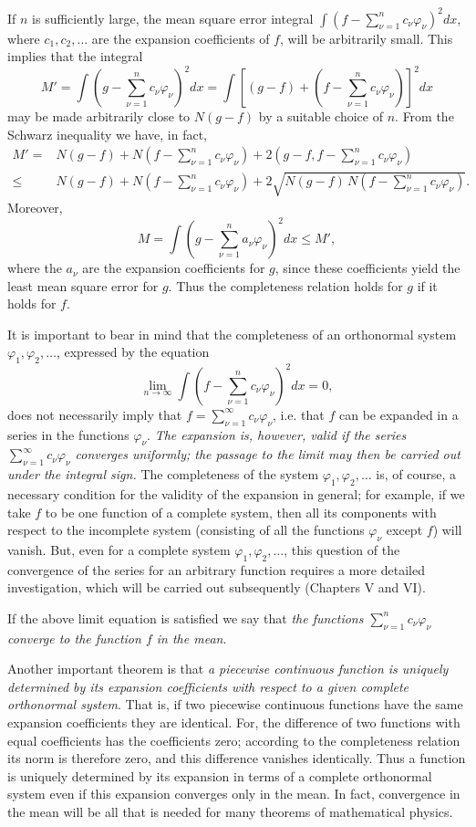 If $n$ is sufficiently large, the mean square error integral $\int(f-\sum_{\nu=1}^n c_\nu\varphi_\nu)^2dx$, where $c_1,c_2,\ldots$ are the expansion coefficients of $f$, will be arbitrarily small. This implies that the integral
\[
M'=\int\left(g-\sum_{\nu=1}^n c_\nu\varphi_\nu\right)^2dx
=\int\left[(g-f)+\left(f-\sum_{\nu=1}^n c_\nu\varphi_\nu\right)\right]^2dx
\]
may be made arbitrarily close to $N(g-f)$ by a suitable choice of $n$. From the Schwarz inequality we have, in fact,
\[
\begin{aligned}
M'={}&N(g-f)+N\left(f-\sum_{\nu=1}^n c_\nu\varphi_\nu\right)
+2\left(g-f,f-\sum_{\nu=1}^n c_\nu\varphi_\nu\right)\\
\le{}&N(g-f)+N\left(f-\sum_{\nu=1}^n c_\nu\varphi_\nu\right)
+2\sqrt{N(g-f)\,N\left(f-\sum_{\nu=1}^n c_\nu\varphi_\nu\right)}.
\end{aligned}
\]
Moreover,
\[
M=\int\left(g-\sum_{\nu=1}^n a_\nu\varphi_\nu\right)^2dx\le M',
\]
where the $a_\nu$ are the expansion coefficients for $g$, since these coefficients yield the least mean square error for $g$. Thus the completeness relation holds for $g$ if it holds for $f$.

It is important to bear in mind that the completeness of an orthonormal system $\varphi_1,\varphi_2,\ldots$, expressed by the equation
\[
\lim_{n\to\infty}\int\left(f-\sum_{\nu=1}^n c_\nu\varphi_\nu\right)^2dx=0,
\]
does not necessarily imply that $f=\sum_{\nu=1}^{\infty}c_\nu\varphi_\nu$, i.e. that $f$ can be expanded in a series in the functions $\varphi_\nu$. \emph{The expansion is, however, valid if the series $\sum_{\nu=1}^{\infty}c_\nu\varphi_\nu$ converges uniformly; the passage to the limit may then be carried out under the integral sign.} The completeness of the system $\varphi_1,\varphi_2,\ldots$ is, of course, a necessary condition for the validity of the expansion in general; for example, if we take $f$ to be one function of a complete system, then all its components with respect to the incomplete system (consisting of all the functions $\varphi_\nu$ except $f$) will vanish. But, even for a complete system $\varphi_1,\varphi_2,\ldots$, this question of the convergence of the series for an arbitrary function requires a more detailed investigation, which will be carried out subsequently (Chapters V and VI).

If the above limit equation is satisfied we say that \emph{the functions $\sum_{\nu=1}^n c_\nu\varphi_\nu$ converge to the function $f$ in the mean}.

Another important theorem is that \emph{a piecewise continuous function is uniquely determined by its expansion coefficients with respect to a given complete orthonormal system}. That is, if two piecewise continuous functions have the same expansion coefficients they are identical. For, the difference of two functions with equal coefficients has the coefficients zero; according to the completeness relation its norm is therefore zero, and this difference vanishes identically. Thus a function is uniquely determined by its expansion in terms of a complete orthonormal system even if this expansion converges only in the mean. In fact, convergence in the mean will be all that is needed for many theorems of mathematical physics.

